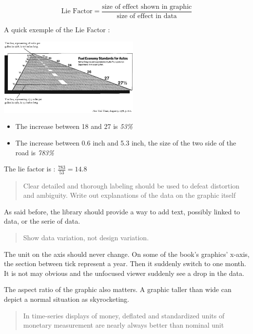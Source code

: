 $$\text{Lie Factor} = \frac{\text{size of effect shown in graphic}}{\text{size of effect in data}}$$

A quick exemple of the Lie Factor :

\centerline{
\includegraphics[width=07cm]{./illustrations/annexes/temps_fuel.eps}
}

\begin{itemize}
\item The increase between 18 and 27 is \emph{53\%}
\item The increase between 0.6 inch and 5.3 inch, the size of the two side of the road is \emph{783\%}
\end{itemize}

The lie factor is  : $\frac{783}{53} = 14.8$ 

\hrulefill

\begin{quote}
Clear detailed and thorough labeling should be used to defeat distortion and ambiguity. Write out explanations of the data on the graphic itself
\end{quote}

As said before, the library should provide a way to add text, possibly linked to data, or the serie of data.

\hrulefill

\begin{quote}
Show data variation, not design variation.
\end{quote}

The unit on the axis should never change.
 On some of the book's graphics' x-axis, the section between tick represent a year.
Then it suddenly switch to one month.
 It is not may obvious and the unfocused viewer suddenly see a drop in the data. 

The aspect ratio of the graphic also matters. A graphic taller than wide can depict a normal situation as skyrocketing.

\hrulefill

\begin{quote}
In time-series displays of money, deflated and standardized units of monetary measurement are nearly always better than nominal unit
\end{quote}

